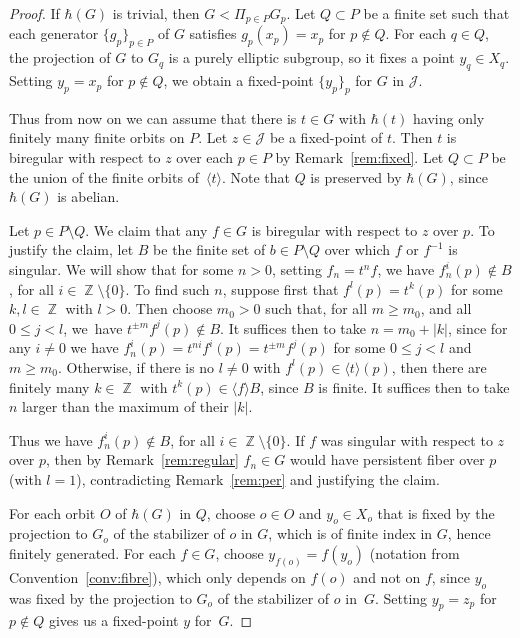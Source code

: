 \documentclass[11pt]{article}
\numberwithin{equation}{section}
\newcommand{\Z}{\operatorname{\mathbb{Z}}}
\newcommand{\Jon}{\mathscr{J}}
\theoremstyle{plain}
\theoremstyle{definition}
\begin{document}
\begin{proof} If $\hbar(G)$ is trivial, then $G<\Pi_{p\in P} G_p$. Let $Q\subset P$ be a finite set such that each generator $\{g_p\}_{p\in P}$ of $G$ satisfies $g_p(x_p)=x_p$ for $p\notin Q$. For each $q\in Q$, the projection of $G$ to $G_q$ is a purely elliptic subgroup, so it fixes a point $y_q\in X_q$. Setting $y_p=x_p$ for $p\notin Q$, we obtain a fixed-point $\{y_p\}_p$ for $G$ in $\Jon$.

Thus from now on we can assume that there is $t\in G$ with $\hbar(t)$ having only finitely many finite orbits on $P$. Let $z\in \Jon$ be a fixed-point of $t$. Then $t$ is biregular with respect to $z$ over each $p\in P$ {by Remark~\ref{rem:fixed}}.
Let $Q\subset P$ be the union of the finite orbits of~$\langle t\rangle$. Note that $Q$ is preserved by $\hbar(G)$, since $\hbar(G)$ is abelian.

Let $p\in P\setminus Q$. We claim that any $f\in G$ is biregular with respect to $z$ over $p$.
To justify the claim, let $B$ be the finite set of $b\in P\setminus Q$ over which $f$ or $f^{-1}$ is singular. We will show that for some $n>0$, setting $f_n=t^nf$, we have $f_n^i(p)\notin B$, for all $i \in \Z\setminus \{0\}$.
To find such $n$, suppose first that $f^l(p)=t^k(p)$ for some $k,l\in \Z$ with $l> 0$. Then choose $m_0>0$ such that, for all $m\geq m_0$, and all $0\leq j<l$, we~have $t^{\pm m}f^j(p)\notin B$. It suffices then to take $n=m_0+|k|$,
since for any $i\neq 0$ we have $f_n^i(p)=t^{ni}f^i(p)=t^{\pm m}f^j(p)$ for some $0\leq j<l$ and $m\geq m_0$. Otherwise, if there is no $l\neq 0$ with $f^l(p)\in \langle t \rangle(p)$, then
there are finitely many $k\in \Z$ with $t^k(p)\in \langle f\rangle B$, since $B$ is finite. It suffices then to take $n$ larger than the maximum of their $|k|$.

Thus we have $f_n^i(p)\notin B$, for all $i \in \Z\setminus \{0\}$. If $f$ was singular with respect to $z$ over $p$, then by Remark~\ref{rem:regular} $f_n\in G$ would have persistent fiber over $p$ (with $l=1$), contradicting Remark~\ref{rem:per} and justifying the claim.

For each orbit $O$ of $\hbar(G)$ in $Q$, choose $o\in O$ and $y_o\in X_o$ that is fixed by the projection to $G_o$ of the stabilizer of $o$ in $G$, which is of finite index in $G$, hence finitely generated. For each $f\in G$, choose $y_{f(o)}=f(y_o)$ (notation from Convention~\ref{conv:fibre}),
which only depends on $f(o)$ and not on $f$, since $y_o$ was fixed by the projection to $G_o$ of the stabilizer of $o$ in~$G$.
Setting $y_p=z_p$ for $p\notin Q$ gives us a fixed-point $y$ for~$G$.
\end{proof}
\end{document}
